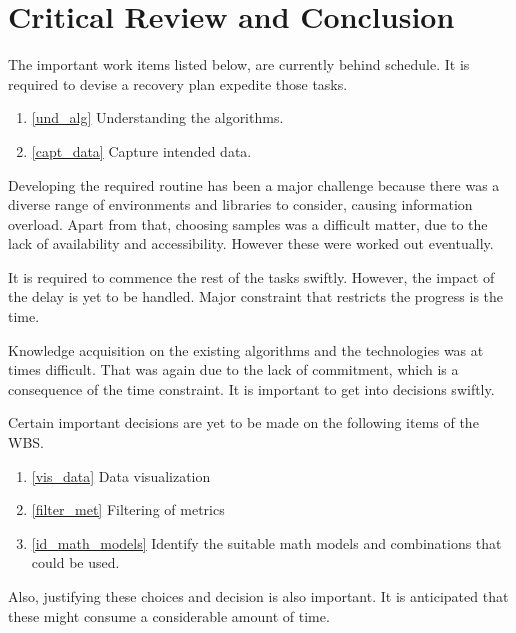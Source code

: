 \documentclass{scrartcl}
\begin{document}
\newpage\section{Critical Review and Conclusion}
The important work items listed below, are currently behind schedule. It is required to devise a recovery plan expedite those tasks.
    \begin{enumerate}
        \item \ref{und_alg} Understanding the algorithms.
        \item \ref{capt_data} Capture intended data.
    \end{enumerate}
\par Developing the required routine has been a major challenge because there was a diverse range of environments and libraries to consider, causing information overload. Apart from that, choosing samples was a difficult matter, due to the lack of availability and accessibility. However these were worked out eventually.

\par It is required to commence the rest of the tasks swiftly. However, the impact of the delay is yet to be handled. Major constraint that restricts the progress is the time.

\par Knowledge acquisition on the existing algorithms and the technologies was at times difficult. That was again due to the lack of commitment, which is a consequence of the time constraint. It is important to get into decisions swiftly.

\par Certain important decisions are yet to be made on the following items of the WBS.
    \begin{enumerate}
        \item \ref{vis_data} Data visualization
        \item \ref{filter_met} Filtering of metrics
        \item \ref{id_math_models} Identify the suitable math models and combinations that could be used.
    \end{enumerate}

\par Also, justifying these choices and decision is also important. It is anticipated that these might consume a considerable amount of time.

\newpage


\end{document}
